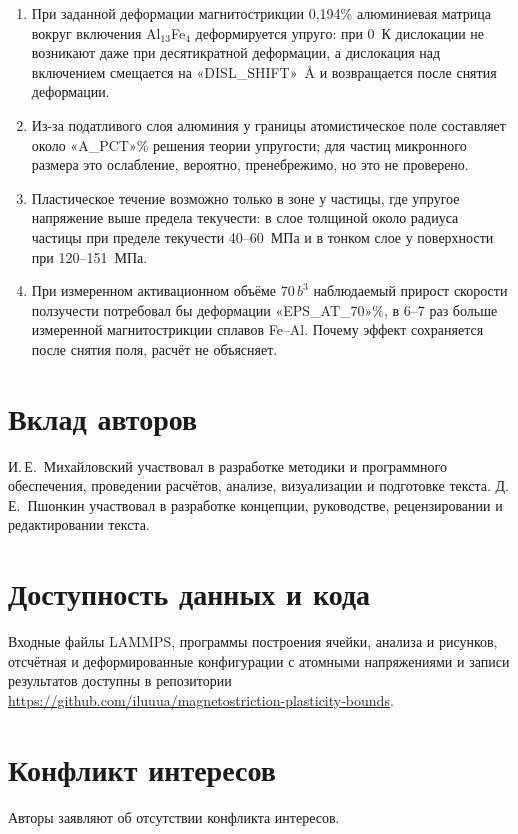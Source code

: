 \documentclass[11pt,a4paper]{article}
\begin{document}
\begin{enumerate}
\item При заданной деформации магнитострикции 0{,}194\% алюминиевая
матрица вокруг включения Al$_{13}$Fe$_4$ деформируется упруго: при 0~К
дислокации не возникают даже при десятикратной деформации, а дислокация
над включением смещается на «DISL_SHIFT»~\AA{} и возвращается после снятия
деформации.
\item Из-за податливого слоя алюминия у границы атомистическое поле
составляет около «A_PCT»\% решения теории упругости; для частиц
микронного размера это ослабление, вероятно, пренебрежимо, но это не
проверено.
\item Пластическое течение возможно только в зоне у частицы, где
упругое напряжение выше предела текучести: в слое толщиной около радиуса
частицы при пределе текучести 40--60~МПа и в тонком слое у поверхности
при 120--151~МПа.
\item При измеренном активационном объёме $70\,b^3$ наблюдаемый прирост
скорости ползучести потребовал бы деформации «EPS_AT_70»\%, в 6--7 раз
больше измеренной магнитострикции сплавов Fe--Al. Почему эффект
сохраняется после снятия поля, расчёт не объясняет.
\end{enumerate}

\section*{Вклад авторов}

И.\,Е.~Михайловский участвовал в разработке методики
и программного обеспечения, проведении расчётов, анализе, визуализации
и подготовке текста. Д.\,Е.~Пшонкин участвовал в разработке концепции,
руководстве, рецензировании и редактировании текста.

\section*{Доступность данных и кода}

Входные файлы LAMMPS, программы построения ячейки, анализа и рисунков,
отсчётная и деформированные конфигурации с атомными напряжениями
и записи результатов доступны в репозитории
\url{https://github.com/iluuua/magnetostriction-plasticity-bounds}.

\section*{Конфликт интересов}

Авторы заявляют об отсутствии конфликта интересов.



\end{document}
